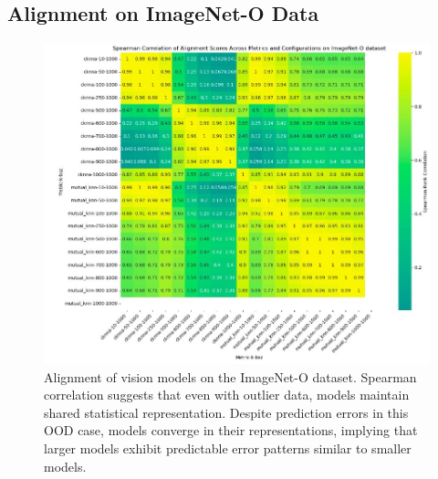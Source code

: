 \documentclass[10pt,a4paper]{article}
\begin{document}
\subsection{Alignment on ImageNet-O Data}
\begin{figure}[H]
    \centering
    \includegraphics[width=\textwidth]{prh_correlation_ood.jpg}
    \caption{Alignment of vision models on the ImageNet-O dataset. Spearman correlation suggests that even with outlier data, models maintain shared statistical representation. Despite prediction errors in this OOD case, models converge in their representations, implying that larger models exhibit predictable error patterns similar to smaller models.}
    \label{fig:prh_correlation_ood}
\end{figure}
\end{document}
